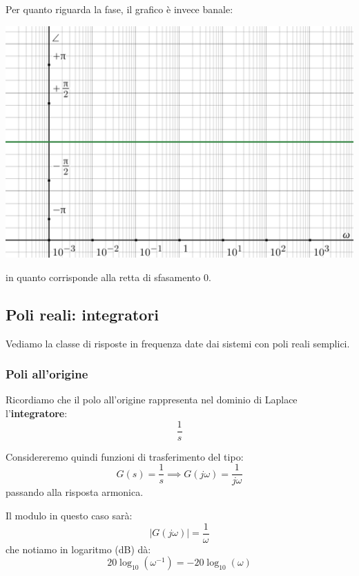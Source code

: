 \documentclass[a4paper,11pt]{article}
\begin{document}
\par\bigskip

Per quanto riguarda la fase, il grafico è invece banale:
\begin{center}
	\includegraphics[scale=0.3]{../figures/costant_bode/phase.png}
\end{center}
in quanto corrisponde alla retta di sfasamento 0.

\subsection{Poli reali: integratori}
Vediamo la classe di risposte in frequenza date dai sistemi con poli reali semplici.

\subsubsection{Poli all'origine}
Ricordiamo che il polo all'origine rappresenta nel dominio di Laplace l'\textbf{integratore}:
$$
\frac{1}{s}
$$

Considereremo quindi funzioni di trasferimento del tipo:
$$
G(s) = \frac{1}{s} \implies G(j \omega) = \frac{1}{j\omega}
$$
passando alla risposta armonica.

Il modulo in questo caso sarà:
$$
|G(j\omega)| = \frac{1}{\omega} 
$$
che notiamo in logaritmo (dB) dà:
$$
20 \log_{10} \left( \omega^{-1} \right) = - 20 \log_{10} (\omega)
$$

\par\bigskip
\end{document}
